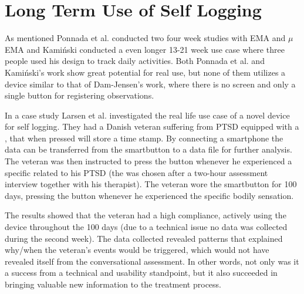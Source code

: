 \section{Long Term Use of Self Logging}
As mentioned Ponnada et al.\cite{compare} conducted two four week studies with EMA and $\mu$EMA and Kami\'nski conducted a even longer 13-21 week use case where three people used his design to track daily activities. Both Ponnada et al. and Kami\'nski's work show great potential for real use, but none of them utilizes a device similar to that of Dam-Jensen's work, where there is no screen and only a single button for registering observations.

In a case study Larsen et al.\cite{eg} investigated the real life use case of a novel device for self logging. They had a Danish veteran suffering from PTSD equipped with a , that when pressed will store a time stamp. By connecting a smartphone the data can be transferred from the smartbutton to a data file for further analysis. The veteran was then instructed to press the button whenever he experienced a specific  related to his PTSD (the  was chosen after a two-hour assessment interview together with his therapist). The veteran wore the smartbutton for 100 days, pressing the button whenever he experienced the specific bodily sensation.

The results showed that the veteran had a high compliance, actively using the device throughout the 100 days (due to a technical issue no data was collected during the second week). The data collected revealed patterns that explained why/when the veteran's events would be triggered, which would not have revealed itself from the conversational assessment. In other words, not only was it a success from a technical and usability standpoint, but it also succeeded in bringing valuable new information to the treatment process. 







